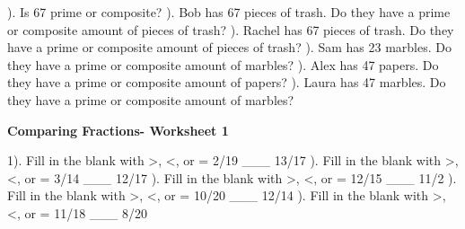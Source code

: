 \documentclass{article}%
\begin{document}
). Is 67 prime or composite?%
\newline%
\newline%
). Bob has 67 pieces of trash. Do they have a prime or composite amount of pieces of trash?%
\newline%
\newline%
). Rachel has 67 pieces of trash. Do they have a prime or composite amount of pieces of trash?%
\newline%
\newline%
). Sam has 23 marbles. Do they have a prime or composite amount of marbles?%
\newline%
\newline%
). Alex has 47 papers. Do they have a prime or composite amount of papers?%
\newline%
\newline%
). Laura has 47 marbles. Do they have a prime or composite amount of marbles?%
\newline%
\newline%
\newline%
\pagebreak%
\large%
\begin{center}%
\textbf{Comparing Fractions- Worksheet 1}%
\newline%
\end{center} \normalsize%
1). Fill in the blank with >, <, or = 2/19 \_\_\_ 13/17%
\newline%
\newline%
). Fill in the blank with >, <, or = 3/14 \_\_\_ 12/17%
\newline%
\newline%
). Fill in the blank with >, <, or = 12/15 \_\_\_ 11/2%
\newline%
\newline%
). Fill in the blank with >, <, or = 10/20 \_\_\_ 12/14%
\newline%
\newline%
). Fill in the blank with >, <, or = 11/18 \_\_\_ 8/20%
\newline%
\newline%
\end{document}
